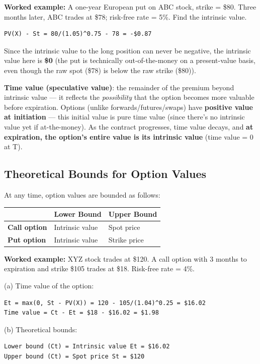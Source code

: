 \documentclass[12pt,openany]{book}
\theoremstyle{definition}
\theoremstyle{remark}
\begin{document}
\textbf{Worked example:} A one-year European put on ABC stock, strike = \$80. Three months later, ABC trades at \$78; risk-free rate = 5\%. Find the intrinsic value.
\begin{lstlisting}[style=notesCode]
PV(X) - St = 80/(1.05)^0.75 - 78 = -$0.87
\end{lstlisting}
Since the intrinsic value to the long position can never be negative, the intrinsic value here is \textbf{\$0} (the put is technically out-of-the-money on a present-value basis, even though the raw spot (\$78) is below the raw strike (\$80)).

\textbf{Time value (speculative value)}: the remainder of the premium beyond intrinsic value — it reflects the \emph{possibility} that the option becomes more valuable before expiration. Options (unlike forwards/futures/swaps) have \textbf{positive value at initiation} — this initial value is pure time value (since there's no intrinsic value yet if at-the-money). As the contract progresses, time value decays, and \textbf{at expiration, the option's entire value is its intrinsic value} (time value = 0 at T).

\subsection{Theoretical Bounds for Option Values}

At any time, option values are bounded as follows:

{\small
\begin{longtable}{@{}L{0.18\textwidth}L{0.34\textwidth}L{0.38\textwidth}@{}}
\toprule
\textbf{} & \textbf{Lower Bound} & \textbf{Upper Bound} \\
\midrule
\textbf{Call option} & Intrinsic value & Spot price \\
\textbf{Put option} & Intrinsic value & Strike price \\
\bottomrule
\end{longtable}
}

\textbf{Worked example:} XYZ stock trades at \$120. A call option with 3 months to expiration and strike \$105 trades at \$18. Risk-free rate = 4\%.

(a) Time value of the option:
\begin{lstlisting}[style=notesCode]
Et = max(0, St - PV(X)) = 120 - 105/(1.04)^0.25 = $16.02
Time value = Ct - Et = $18 - $16.02 = $1.98
\end{lstlisting}
(b) Theoretical bounds:
\begin{lstlisting}[style=notesCode]
Lower bound (Ct) = Intrinsic value Et = $16.02
Upper bound (Ct) = Spot price St = $120
\end{lstlisting}
\end{document}
